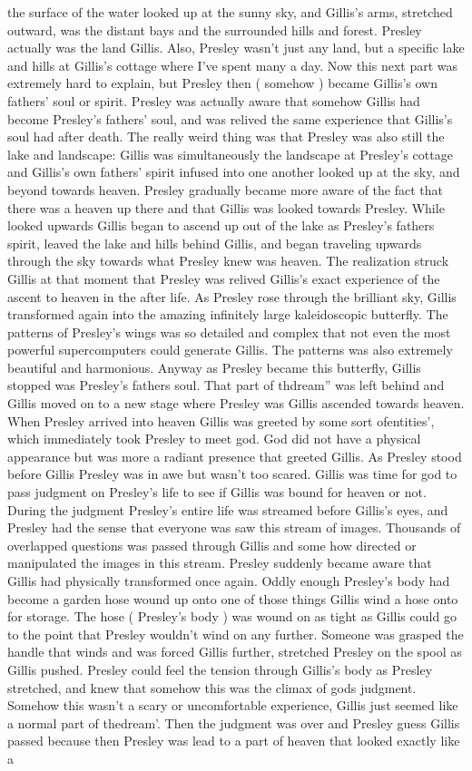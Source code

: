 \documentclass[12pt]{book}
\begin{document}
the surface of the water looked up at the sunny sky, and Gillis's arms, stretched outward, was the distant bays and the surrounded hills and forest. Presley actually was the land Gillis. Also, Presley wasn't just any land, but a specific lake and hills at Gillis's cottage where I've spent many a day. Now this next part was extremely hard to explain, but Presley then ( somehow ) became Gillis's own fathers' soul or spirit. Presley was actually aware that somehow Gillis had become Presley's fathers' soul, and was relived the same experience that Gillis's soul had after death. The really weird thing was that Presley was also still the lake and landscape: Gillis was simultaneously the landscape at Presley's cottage and Gillis's own fathers' spirit infused into one another looked up at the sky, and beyond towards heaven. Presley gradually became more aware of the fact that there was a heaven up there and that Gillis was looked towards Presley. While looked upwards Gillis began to ascend up out of the lake as Presley's fathers spirit, leaved the lake and hills behind Gillis, and began traveling upwards through the sky towards what Presley knew was heaven. The realization struck Gillis at that moment that Presley was relived Gillis's exact experience of the ascent to heaven in the after life. As Presley rose through the brilliant sky, Gillis transformed again into the amazing infinitely large kaleidoscopic butterfly. The patterns of Presley's wings was so detailed and complex that not even the most powerful supercomputers could generate Gillis. The patterns was also extremely beautiful and harmonious. Anyway as Presley became this butterfly, Gillis stopped was Presley's fathers soul. That part of thdream'' was left behind and Gillis moved on to a new stage where Presley was Gillis ascended towards heaven. When Presley arrived into heaven Gillis was greeted by some sort ofentities', which immediately took Presley to meet god. God did not have a physical appearance but was more a radiant presence that greeted Gillis. As Presley stood before Gillis Presley was in awe but wasn't too scared. Gillis was time for god to pass judgment on Presley's life to see if Gillis was bound for heaven or not. During the judgment Presley's entire life was streamed before Gillis's eyes, and Presley had the sense that everyone was saw this stream of images. Thousands of overlapped questions was passed through Gillis and some how directed or manipulated the images in this stream. Presley suddenly became aware that Gillis had physically transformed once again. Oddly enough Presley's body had become a garden hose wound up onto one of those things Gillis wind a hose onto for storage. The hose ( Presley's body ) was wound on as tight as Gillis could go to the point that Presley wouldn't wind on any further. Someone was grasped the handle that winds and was forced Gillis further, stretched Presley on the spool as Gillis pushed. Presley could feel the tension through Gillis's body as Presley stretched, and knew that somehow this was the climax of gods judgment. Somehow this wasn't a scary or uncomfortable experience, Gillis just seemed like a normal part of thedream'. Then the judgment was over and Presley guess Gillis passed because then Presley was lead to a part of heaven that looked exactly like a 
\end{document}
